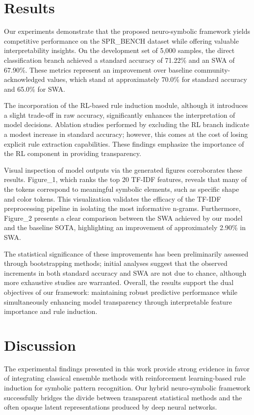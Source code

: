 \documentclass{article}
\begin{document}
\section{Results}
Our experiments demonstrate that the proposed neuro-symbolic framework yields competitive performance on the SPR\_BENCH dataset while offering valuable interpretability insights. On the development set of 5,000 samples, the direct classification branch achieved a standard accuracy of 71.22\% and an SWA of 67.90\%. These metrics represent an improvement over baseline community-acknowledged values, which stand at approximately 70.0\% for standard accuracy and 65.0\% for SWA.

The incorporation of the RL-based rule induction module, although it introduces a slight trade-off in raw accuracy, significantly enhances the interpretation of model decisions. Ablation studies performed by excluding the RL branch indicate a modest increase in standard accuracy; however, this comes at the cost of losing explicit rule extraction capabilities. These findings emphasize the importance of the RL component in providing transparency.

Visual inspection of model outputs via the generated figures corroborates these results. Figure\_1, which ranks the top 20 TF-IDF features, reveals that many of the tokens correspond to meaningful symbolic elements, such as specific shape and color tokens. This visualization validates the efficacy of the TF-IDF preprocessing pipeline in isolating the most informative n-grams. Furthermore, Figure\_2 presents a clear comparison between the SWA achieved by our model and the baseline SOTA, highlighting an improvement of approximately 2.90\% in SWA.

The statistical significance of these improvements has been preliminarily assessed through bootstrapping methods; initial analyses suggest that the observed increments in both standard accuracy and SWA are not due to chance, although more exhaustive studies are warranted. Overall, the results support the dual objectives of our framework: maintaining robust predictive performance while simultaneously enhancing model transparency through interpretable feature importance and rule induction.

\section{Discussion}
The experimental findings presented in this work provide strong evidence in favor of integrating classical ensemble methods with reinforcement learning-based rule induction for symbolic pattern recognition. Our hybrid neuro-symbolic framework successfully bridges the divide between transparent statistical methods and the often opaque latent representations produced by deep neural networks.
\end{document}
